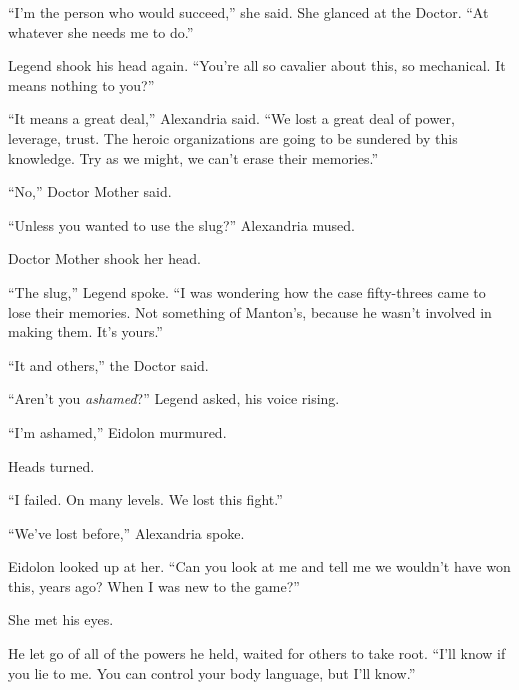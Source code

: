 ``I'm the person who would succeed,'' she said.  She glanced at the Doctor.  ``At whatever she needs me to do.''



Legend shook his head again.  ``You're all so cavalier about this, so mechanical.  It means nothing to you?''



``It means a great deal,'' Alexandria said.  ``We lost a great deal of power, leverage, trust.  The heroic organizations are going to be sundered by this knowledge.  Try as we might, we can't erase their memories.''



``No,'' Doctor Mother said.



``Unless you wanted to use the slug?''  Alexandria mused.



Doctor Mother shook her head.



``The slug,'' Legend spoke.  ``I was wondering how the case fifty-threes came to lose their memories.  Not something of Manton's, because he wasn't involved in making them.  It's yours.''



``It and others,'' the Doctor said.



``Aren't you \emph{ashamed}?'' Legend asked, his voice rising.



``I'm ashamed,'' Eidolon murmured.



Heads turned.



``I failed.  On many levels.  We lost this fight.''



``We've lost before,'' Alexandria spoke.



Eidolon looked up at her.  ``Can you look at me and tell me we wouldn't have won this, years ago?  When I was new to the game?''



She met his eyes.



He let go of all of the powers he held, waited for others to take root.  ``I'll know if you lie to me.  You can control your body language, but I'll know.''



